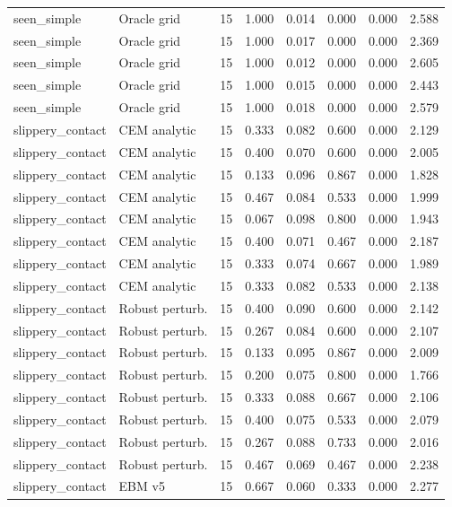 {\begin{longtable}{llrrrrrr}
seen\_simple & Oracle grid & 15 & 1.000 & 0.014 & 0.000 & 0.000 & 2.588 \\
seen\_simple & Oracle grid & 15 & 1.000 & 0.017 & 0.000 & 0.000 & 2.369 \\
seen\_simple & Oracle grid & 15 & 1.000 & 0.012 & 0.000 & 0.000 & 2.605 \\
seen\_simple & Oracle grid & 15 & 1.000 & 0.015 & 0.000 & 0.000 & 2.443 \\
seen\_simple & Oracle grid & 15 & 1.000 & 0.018 & 0.000 & 0.000 & 2.579 \\
slippery\_contact & CEM analytic & 15 & 0.333 & 0.082 & 0.600 & 0.000 & 2.129 \\
slippery\_contact & CEM analytic & 15 & 0.400 & 0.070 & 0.600 & 0.000 & 2.005 \\
slippery\_contact & CEM analytic & 15 & 0.133 & 0.096 & 0.867 & 0.000 & 1.828 \\
slippery\_contact & CEM analytic & 15 & 0.467 & 0.084 & 0.533 & 0.000 & 1.999 \\
slippery\_contact & CEM analytic & 15 & 0.067 & 0.098 & 0.800 & 0.000 & 1.943 \\
slippery\_contact & CEM analytic & 15 & 0.400 & 0.071 & 0.467 & 0.000 & 2.187 \\
slippery\_contact & CEM analytic & 15 & 0.333 & 0.074 & 0.667 & 0.000 & 1.989 \\
slippery\_contact & CEM analytic & 15 & 0.333 & 0.082 & 0.533 & 0.000 & 2.138 \\
slippery\_contact & Robust perturb. & 15 & 0.400 & 0.090 & 0.600 & 0.000 & 2.142 \\
slippery\_contact & Robust perturb. & 15 & 0.267 & 0.084 & 0.600 & 0.000 & 2.107 \\
slippery\_contact & Robust perturb. & 15 & 0.133 & 0.095 & 0.867 & 0.000 & 2.009 \\
slippery\_contact & Robust perturb. & 15 & 0.200 & 0.075 & 0.800 & 0.000 & 1.766 \\
slippery\_contact & Robust perturb. & 15 & 0.333 & 0.088 & 0.667 & 0.000 & 2.106 \\
slippery\_contact & Robust perturb. & 15 & 0.400 & 0.075 & 0.533 & 0.000 & 2.079 \\
slippery\_contact & Robust perturb. & 15 & 0.267 & 0.088 & 0.733 & 0.000 & 2.016 \\
slippery\_contact & Robust perturb. & 15 & 0.467 & 0.069 & 0.467 & 0.000 & 2.238 \\
slippery\_contact & EBM v5 & 15 & 0.667 & 0.060 & 0.333 & 0.000 & 2.277 \\

\end{longtable}}
